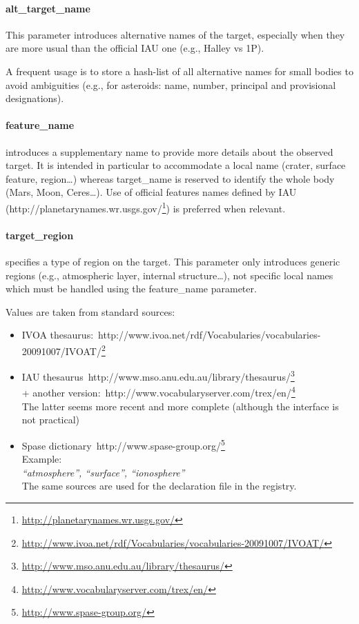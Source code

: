 \documentclass[11pt,a4paper]{ivoa}
\begin{document}
\paragraph{alt\_target\_name}

This parameter introduces alternative names of the target, especially when they are more usual than the official IAU one (e.g., Halley vs 1P).

A frequent usage is to store a hash-list of all alternative names for small bodies to avoid ambiguities (e.g., for asteroids: name, number, principal and provisional designations).

\paragraph{feature\_name}

introduces a supplementary name to provide more details about the observed target. It is intended in particular to accommodate a local name (crater, surface feature, region…) whereas target\_name is reserved to identify the whole body (Mars, Moon, Ceres…). Use of official features names defined by IAU (http://planetarynames.wr.usgs.gov/\footnote{\url{http://planetarynames.wr.usgs.gov/}}) is preferred when relevant.

\paragraph{target\_region}

specifies a type of region on the target. This parameter only introduces generic regions  (e.g., atmospheric layer, internal structure…), not specific local names which must be handled using the feature\_name parameter.

Values are taken from standard sources:

\begin{itemize}
\item IVOA thesaurus: http://www.ivoa.net/rdf/Vocabularies/vocabularies-20091007/IVOAT/\footnote{\url{http://www.ivoa.net/rdf/Vocabularies/vocabularies-20091007/IVOAT/}}
\item IAU thesaurus http://www.mso.anu.edu.au/library/thesaurus/\footnote{\url{http://www.mso.anu.edu.au/library/thesaurus/}}\\+ another version: http://www.vocabularyserver.com/trex/en/\footnote{\url{http://www.vocabularyserver.com/trex/en/}}\\The latter seems more recent and more complete (although the interface is not practical)
\item Spase dictionary http://www.spase-group.org/\footnote{\url{http://www.spase-group.org/}}\\Example: \\\emph{``atmosphere'', ``surface'', ``ionosphere''}\\The same sources are used for the declaration file in the registry.
\end{itemize}
\end{document}
